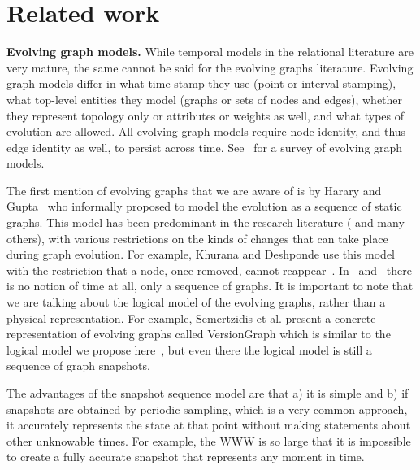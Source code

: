 \section{Related work}
\label{sec:related}

{\bf Evolving graph models.}  While temporal models in the relational
literature are very mature, the same cannot be said for the evolving
graphs literature.  Evolving graph models differ in what time stamp
they use (point or interval stamping), what top-level entities they
model (graphs or sets of nodes and edges), whether they represent
topology only or attributes or weights as well, and what types of
evolution are allowed.  All evolving graph models require node
identity, and thus edge identity as well, to persist across time.
See~\cite{Zaki2016} for a survey of evolving graph models.

The first mention of evolving graphs that we are aware of is by Harary
and Gupta~\cite{Harary1997} who informally proposed to model the
evolution as a sequence of static graphs.  This model has been
predominant in the research literature
(\cite{Borgwardt2006,Fard2012,Ferreira2004,Kan2009,Khurana2013,Ren2011}
and many others), with various restrictions on the kinds of changes
that can take place during graph evolution.  For example, Khurana and
Deshponde use this model with the restriction that a node, once
removed, cannot reappear~\cite{Khurana2013}.  In~\cite{Ren2011}
and~\cite{Fard2012} there is no notion of time at all, only a sequence
of graphs.  It is important
to note that we are talking about the logical model of the evolving
graphs, rather than a physical representation.  For example,
Semertzidis et al. present a concrete representation of evolving
graphs called VersionGraph which is similar to the logical model we
propose here~\cite{Semertzidis2015}, but even there the logical model
is still a sequence of graph snapshots.

The advantages of the snapshot sequence model are that a) it is simple
and b) if snapshots are obtained by periodic sampling, which is a very
common approach, it accurately represents the state at that point
without making statements about other unknowable times.  For example,
the WWW is so large that it is impossible to create a fully accurate
snapshot that represents any moment in time.

